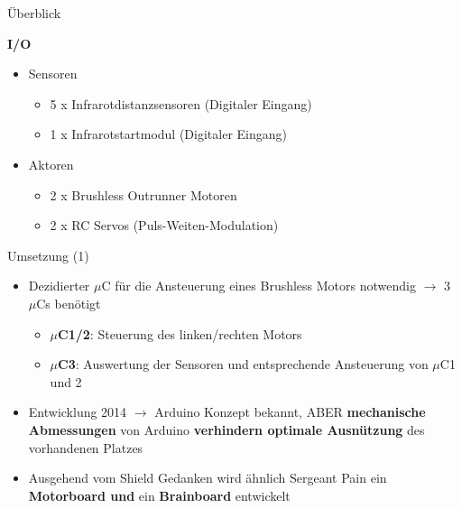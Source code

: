 \documentclass{beamer}
\begin{document}
\begin{frame}{\"Uberblick}
\begin{large}\textbf{I/O}\end{large}
\begin{itemize}
	\item Sensoren
	\begin{itemize}
		\item 5 x Infrarotdistanzsensoren (Digitaler Eingang)
		\item 1 x Infrarotstartmodul (Digitaler Eingang)
	\end{itemize}
	\item Aktoren
	\begin{itemize}
		\item 2 x Brushless Outrunner Motoren
		\item 2 x RC Servos (Puls-Weiten-Modulation)
	\end{itemize}
\end{itemize}
\end{frame}
\begin{frame}{Umsetzung (1)}
\begin{itemize}
	\item Dezidierter $\mu$C f\"ur die Ansteuerung eines Brushless Motors notwendig $\rightarrow$ 3 $\mu$Cs ben\"otigt
	\begin{itemize}
		\item \textbf{$\mu$C1/2}: Steuerung des linken/rechten Motors
		\item \textbf{$\mu$C3}: Auswertung der Sensoren und entsprechende Ansteuerung von $\mu$C1 und 2
	\end{itemize}
\end{itemize}
\begin{itemize}
	\item Entwicklung 2014 $\rightarrow$ Arduino Konzept bekannt, ABER \textbf{mechanische Abmessungen} von Arduino \textbf{verhindern optimale Ausn\"utzung} des vorhandenen Platzes
\end{itemize}
\begin{itemize}
	\item Ausgehend vom Shield Gedanken wird \"ahnlich Sergeant Pain ein \textbf{Motorboard und} ein \textbf{Brainboard} entwickelt
\end{itemize}
\end{frame}
\end{document}
